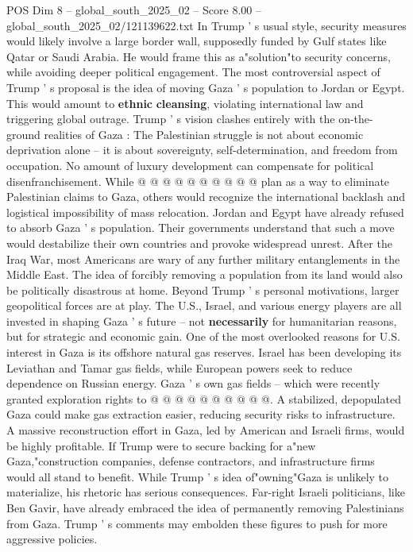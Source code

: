 \begin{textsample}{POS Dim 8 – global\_south\_2025\_02 – Score 8.00 – global\_south\_2025\_02/121139622.txt}
In Trump ' s usual style, security measures would likely involve a large border wall, supposedly funded by Gulf states like Qatar or Saudi Arabia.
He would frame this as a"solution"to security concerns, while avoiding deeper political engagement.
The most controversial aspect of Trump ' s proposal is the idea of moving Gaza ' s population to Jordan or Egypt.
This would amount to \textbf{ethnic} \textbf{cleansing}, violating international law and triggering global outrage.
Trump ' s vision clashes entirely with the on-the-ground realities of Gaza : The Palestinian struggle is not about economic deprivation alone -- it is about sovereignty, self-determination, and freedom from occupation.
No amount of luxury development can compensate for political disenfranchisement.
While @ @ @ @ @ @ @ @ @ @ plan as a way to eliminate Palestinian claims to Gaza, others would recognize the international backlash and logistical impossibility of mass relocation.
Jordan and Egypt have already refused to absorb Gaza ' s population.
Their governments understand that such a move would destabilize their own countries and provoke widespread unrest.
After the Iraq War, most Americans are wary of any further military entanglements in the Middle East.
The idea of forcibly removing a population from its land would also be politically disastrous at home.
Beyond Trump ' s personal motivations, larger geopolitical forces are at play.
The U.S., Israel, and various energy players are all invested in shaping Gaza ' s future -- not \textbf{necessarily} for humanitarian reasons, but for strategic and economic gain.
One of the most overlooked reasons for U.S. interest in Gaza is its offshore natural gas reserves.
Israel has been developing its Leviathan and Tamar gas fields, while European powers seek to reduce dependence on Russian energy.
Gaza ' s own gas fields -- which were recently granted exploration rights to @ @ @ @ @ @ @ @ @ @.
A stabilized, depopulated Gaza could make gas extraction easier, reducing security risks to infrastructure.
A massive reconstruction effort in Gaza, led by American and Israeli firms, would be highly profitable.
If Trump were to secure backing for a"new Gaza,"construction companies, defense contractors, and infrastructure firms would all stand to benefit.
While Trump ' s idea of"owning"Gaza is unlikely to materialize, his rhetoric has serious consequences.
Far-right Israeli politicians, like Ben Gavir, have already embraced the idea of permanently removing Palestinians from Gaza.
Trump ' s comments may embolden these figures to push for more aggressive policies.

\end{textsample}
